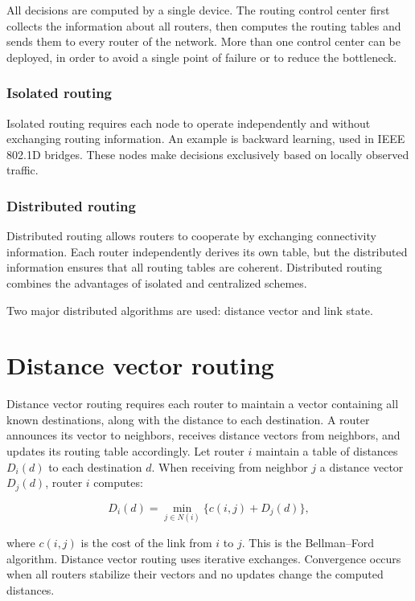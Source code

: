 \documentclass[11pt,a4paper,openany]{report}
\begin{document}
All decisions are computed by a single device. The routing control center
first collects the information about all routers, then computes the routing
tables and sends them to every router of the network. More than one control
center can be deployed, in order to avoid a single point of failure or to
reduce the bottleneck.

\subsubsection*{Isolated routing}

Isolated routing requires each node to operate independently and without exchanging routing information. An example is backward learning, used in IEEE 802.1D bridges. These nodes make decisions exclusively based on locally observed traffic.

\subsubsection*{Distributed routing}

Distributed routing allows routers to cooperate by exchanging connectivity information. Each router independently derives its own table, but the distributed information ensures that all routing tables are coherent. Distributed routing combines the advantages of isolated and centralized schemes.

Two major distributed algorithms are used: distance vector and link state.

\section{Distance vector routing}

Distance vector routing requires each router to maintain a vector containing all known destinations, along with the distance to each destination. A router announces its vector to neighbors, receives distance vectors from neighbors, and updates its routing table accordingly. Let router $i$ maintain a table of distances $D_i(d)$ to each destination $d$. When receiving from neighbor $j$ a distance vector $D_j(d)$, router $i$ computes:

\[ D_i(d) = \min_{j \in N(i)} \bigl\{ c(i,j) + D_j(d) \bigr\}, \]

\noindent where $c(i,j)$ is the cost of the link from $i$ to $j$. This is the Bellman--Ford algorithm. Distance vector routing uses iterative exchanges. Convergence occurs when all routers stabilize their vectors and no updates change the computed distances.
\end{document}
